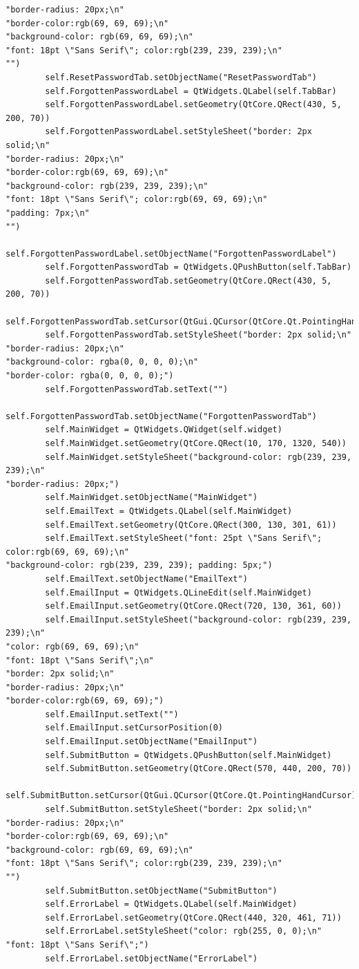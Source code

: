\documentclass{article}
\begin{document}
\begin{lstlisting}
"border-radius: 20px;\n"
"border-color:rgb(69, 69, 69);\n"
"background-color: rgb(69, 69, 69);\n"
"font: 18pt \"Sans Serif\"; color:rgb(239, 239, 239);\n"
"")
        self.ResetPasswordTab.setObjectName("ResetPasswordTab")
        self.ForgottenPasswordLabel = QtWidgets.QLabel(self.TabBar)
        self.ForgottenPasswordLabel.setGeometry(QtCore.QRect(430, 5, 200, 70))
        self.ForgottenPasswordLabel.setStyleSheet("border: 2px solid;\n"
"border-radius: 20px;\n"
"border-color:rgb(69, 69, 69);\n"
"background-color: rgb(239, 239, 239);\n"
"font: 18pt \"Sans Serif\"; color:rgb(69, 69, 69);\n"
"padding: 7px;\n"
"")
        self.ForgottenPasswordLabel.setObjectName("ForgottenPasswordLabel")
        self.ForgottenPasswordTab = QtWidgets.QPushButton(self.TabBar)
        self.ForgottenPasswordTab.setGeometry(QtCore.QRect(430, 5, 200, 70))
        self.ForgottenPasswordTab.setCursor(QtGui.QCursor(QtCore.Qt.PointingHandCursor))
        self.ForgottenPasswordTab.setStyleSheet("border: 2px solid;\n"
"border-radius: 20px;\n"
"background-color: rgba(0, 0, 0, 0);\n"
"border-color: rgba(0, 0, 0, 0);")
        self.ForgottenPasswordTab.setText("")
        self.ForgottenPasswordTab.setObjectName("ForgottenPasswordTab")
        self.MainWidget = QtWidgets.QWidget(self.widget)
        self.MainWidget.setGeometry(QtCore.QRect(10, 170, 1320, 540))
        self.MainWidget.setStyleSheet("background-color: rgb(239, 239, 239);\n"
"border-radius: 20px;")
        self.MainWidget.setObjectName("MainWidget")
        self.EmailText = QtWidgets.QLabel(self.MainWidget)
        self.EmailText.setGeometry(QtCore.QRect(300, 130, 301, 61))
        self.EmailText.setStyleSheet("font: 25pt \"Sans Serif\"; color:rgb(69, 69, 69);\n"
"background-color: rgb(239, 239, 239); padding: 5px;")
        self.EmailText.setObjectName("EmailText")
        self.EmailInput = QtWidgets.QLineEdit(self.MainWidget)
        self.EmailInput.setGeometry(QtCore.QRect(720, 130, 361, 60))
        self.EmailInput.setStyleSheet("background-color: rgb(239, 239, 239);\n"
"color: rgb(69, 69, 69);\n"
"font: 18pt \"Sans Serif\";\n"
"border: 2px solid;\n"
"border-radius: 20px;\n"
"border-color:rgb(69, 69, 69);")
        self.EmailInput.setText("")
        self.EmailInput.setCursorPosition(0)
        self.EmailInput.setObjectName("EmailInput")
        self.SubmitButton = QtWidgets.QPushButton(self.MainWidget)
        self.SubmitButton.setGeometry(QtCore.QRect(570, 440, 200, 70))
        self.SubmitButton.setCursor(QtGui.QCursor(QtCore.Qt.PointingHandCursor))
        self.SubmitButton.setStyleSheet("border: 2px solid;\n"
"border-radius: 20px;\n"
"border-color:rgb(69, 69, 69);\n"
"background-color: rgb(69, 69, 69);\n"
"font: 18pt \"Sans Serif\"; color:rgb(239, 239, 239);\n"
"")
        self.SubmitButton.setObjectName("SubmitButton")
        self.ErrorLabel = QtWidgets.QLabel(self.MainWidget)
        self.ErrorLabel.setGeometry(QtCore.QRect(440, 320, 461, 71))
        self.ErrorLabel.setStyleSheet("color: rgb(255, 0, 0);\n"
"font: 18pt \"Sans Serif\";")
        self.ErrorLabel.setObjectName("ErrorLabel")


\end{lstlisting}
\end{document}
